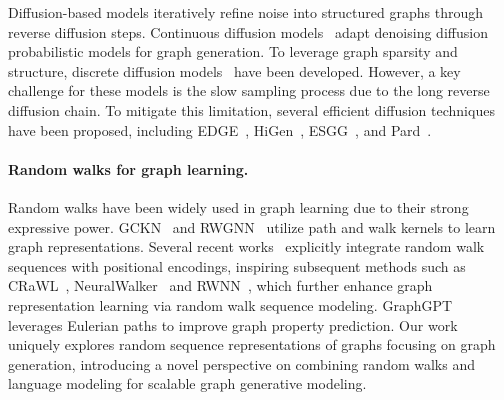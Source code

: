 Diffusion-based models iteratively refine noise into structured graphs through reverse diffusion steps. Continuous diffusion models~\citep{niu2020permutation,jo2022score} adapt denoising diffusion probabilistic models for graph generation. To leverage graph sparsity and structure, discrete diffusion models~\citep{vignac2023digress,kong2023autoregressive} have been developed. However, a key challenge for these models is the slow sampling process due to the long reverse diffusion chain. To mitigate this limitation, several efficient diffusion techniques have been proposed, including EDGE~\citep{chen2023efficient}, HiGen~\citep{karami2024higen}, ESGG~\citep{bergmeister2024efficient}, and Pard~\citep{zhao2024pard}.

\vspace{-.1in}
\paragraph{Random walks for graph learning.}
Random walks have been widely used in graph learning due to their strong expressive power. GCKN~\citep{chen2020convolutional} and RWGNN~\citep{nikolentzos2020random} utilize path and walk kernels to learn graph representations. Several recent works~\citep{ivanov2018anonymous,wang2021inductive,yin2022algorithm} explicitly integrate random walk sequences with positional encodings, inspiring subsequent methods such as CRaWL~\citep{tonshoff2023crawl}, NeuralWalker~\citep{chen2024neuralwalker} and RWNN~\citep{kim2024revisiting}, which further enhance graph representation learning via random walk sequence modeling. GraphGPT~\citep{zhao2023graphgpt} leverages Eulerian paths to improve graph property prediction. Our work uniquely explores random sequence representations of graphs focusing on graph generation, introducing a novel perspective on combining random walks and language modeling for scalable graph generative modeling.